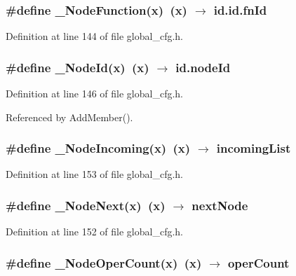 \subsubsection{\setlength{\rightskip}{0pt plus 5cm}\#define \_\-Node\-Function(x)~(x) $\rightarrow$ id.id.fn\-Id}\label{global__cfg_8h_49dc944305ae75695ae50e77a97cc0a1}




Definition at line 144 of file global\_\-cfg.h.
\subsubsection{\setlength{\rightskip}{0pt plus 5cm}\#define \_\-Node\-Id(x)~(x) $\rightarrow$ \bf{id.node\-Id}}\label{global__cfg_8h_1c105295c78be2b45ff046d7bcf15931}




Definition at line 146 of file global\_\-cfg.h.

Referenced by Add\-Member().
\subsubsection{\setlength{\rightskip}{0pt plus 5cm}\#define \_\-Node\-Incoming(x)~(x) $\rightarrow$ incoming\-List}\label{global__cfg_8h_bd87f9dabd77d379aacb6b636e092297}




Definition at line 153 of file global\_\-cfg.h.
\subsubsection{\setlength{\rightskip}{0pt plus 5cm}\#define \_\-Node\-Next(x)~(x) $\rightarrow$ \bf{next\-Node}}\label{global__cfg_8h_2921f85267095b0b8bbe7c04fbf9b14b}




Definition at line 152 of file global\_\-cfg.h.
\subsubsection{\setlength{\rightskip}{0pt plus 5cm}\#define \_\-Node\-Oper\-Count(x)~(x) $\rightarrow$ oper\-Count}\label{global__cfg_8h_9282d449b9e3d7945bf89445aec31b72}





